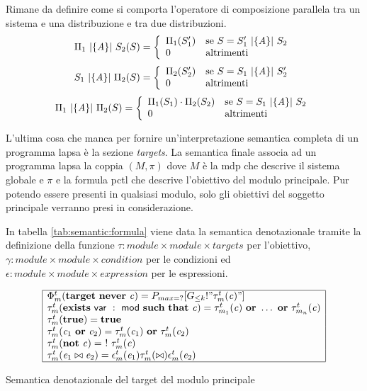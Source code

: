 Rimane da definire come si comporta l'operatore di composizione parallela tra un sistema e una distribuzione e tra due distribuzioni.
$$
\Pi_1 \mbox{ }|{\{\mathit{A}\}}|\mbox{ } S_2 (S) = \left\{
\begin{array}{ll}
	\Pi_1(S_1')	& \mbox{se } S = S_1' \mbox{ }|{\{\mathit{A}\}}|\mbox{ } S_2 \\
	0			& \mbox{altrimenti} \\
\end{array}
\right.
$$
$$
S_1 \mbox{ }|{\{\mathit{A}\}}|\mbox{ } \Pi_2 (S) = \left\{
\begin{array}{ll}
	\Pi_2(S_2')	& \mbox{se } S = S_1 \mbox{ }|{\{\mathit{A}\}}|\mbox{ } S_2' \\
	0			& \mbox{altrimenti} \\
\end{array}
\right.
$$
$$
\Pi_1 \mbox{ }|{\{\mathit{A}\}}|\mbox{ } \Pi_2 (S) = \left\{
\begin{array}{ll}
	\Pi_1(S_1)\cdot\Pi_2(S_2)	& \mbox{se } S = S_1 \mbox{ }|{\{\mathit{A}\}}|\mbox{ } S_2 \\
	0			& \mbox{altrimenti} \\
\end{array}
\right.
$$

L'ultima cosa che manca per fornire un'interpretazione semantica completa di un programma \ac{lapsa} è la sezione \emph{targets}. La semantica finale associa ad un programma \ac{lapsa} la coppia $(M,\pi)$ dove $M$ è la \ac{mdp} che descrive il sistema globale e $\pi$ e la formula \ac{pctl} che descrive l'obiettivo del modulo principale. Pur potendo essere presenti in qualsiasi modulo, solo gli obiettivi del soggetto principale verranno presi in considerazione.

In tabella \ref{tab:semantic:formula} viene data la semantica denotazionale tramite la definizione della funzione $\tau : \mathit{module} \times \mathit{module} \times \mathit{targets}$ per l'obiettivo, $\gamma : \mathit{module} \times \mathit{module} \times \mathit{condition}$ per le condizioni ed $\epsilon : \mathit{module} \times \mathit{module} \times \mathit{expression}$ per le espressioni. 
\begin{table}
$$
\begin{array}{|l|}
	\hline
	\Phi_m^t(\mathbf{target}\ \mathbf{never}\ \mathit{c}) = P_{max = ?}[G_{\leq k} !"\tau_m^t(\mathit{c})"] \\
	\tau_m^t(\mathbf{exists}\ \x{var}\ :\ \x{mod}\ \mathbf{such}\ \mathbf{that}\ \mathit{c}) = \tau_{m_1}^t(\mathit{c})\ \mathbf{or}\ \dots\ \mathbf{or}\ \tau_{m_n}^t(\mathit{c}) \\
	\tau_m^t(\mathbf{true}) = \mathbf{true} \\
	\tau_m^t(\mathit{c}_1\ \mathbf{or}\ \mathit{c}_2) = \tau_m^t(\mathit{c}_1)\ \mathbf{or}\ \tau_m^t(\mathit{c}_2) \\
	\tau_m^t(\mathbf{not}\ \mathit{c}) =\ !\ \tau_m^t(\mathit{c}) \\
	\tau_m^t(\mathit{e}_1 \bowtie \mathit{e}_2) = \epsilon_m^t(\mathit{e}_1) \tau_m^t(\bowtie) \epsilon_m^t(\mathit{e}_2) \\
	\hline
\end{array}
$$
\caption{Semantica denotazionale del target del modulo principale}
\label{tab:semantic:formula}	
\end{table}

